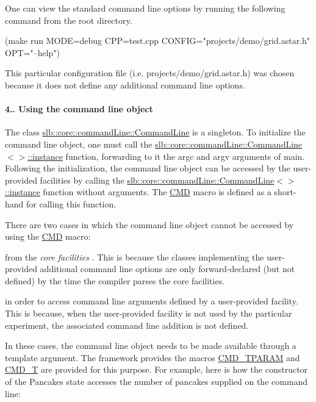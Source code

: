 One can view the standard command line options by running the following command from the root directory. \begin{DoxyVerb}(make run MODE=debug CPP=test.cpp CONFIG="projects/demo/grid.astar.h" OPT="--help")
\end{DoxyVerb}
 This particular configuration file (i.\+e. {\ttfamily projects/demo/grid.\+astar.\+h}) was chosen because it does not define any additional command line options.\hypertarget{index_s-singleton}{}\paragraph{4.. Using the command line object}\label{index_s-singleton}
The class \hyperlink{structslb_1_1core_1_1commandLine_1_1CommandLine}{slb\+::core\+::command\+Line\+::\+Command\+Line} is a singleton. To initialize the command line object, one must call the \hyperlink{structslb_1_1core_1_1commandLine_1_1CommandLine_a297df54d1f330d491717b487968b0fc5}{slb\+::core\+::command\+Line\+::\+Command\+Line$<$$>$\+::instance} function, forwarding to it the {\ttfamily argc} and {\ttfamily argv} arguments of {\ttfamily main}. Following the initialization, the command line object can be accessed by the user-\/provided facilities by calling the \hyperlink{structslb_1_1core_1_1commandLine_1_1CommandLine_a297df54d1f330d491717b487968b0fc5}{slb\+::core\+::command\+Line\+::\+Command\+Line$<$$>$\+::instance} function without arguments. The \hyperlink{command__line_8h_a0a5ceb9ceb914e08d345410b561cb37a}{C\+MD} macro is defined as a short-\/hand for calling this function.

There are two cases in which the command line object cannot be accessed by using the \hyperlink{command__line_8h_a0a5ceb9ceb914e08d345410b561cb37a}{C\+MD} macro\+:
\begin{DoxyItemize}
\item from the {\itshape core facilities} . This is because the classes implementing the user-\/provided additional command line options are only forward-\/declared (but not defined) by the time the compiler parses the core facilities.
\item in order to access command line arguments defined by a user-\/provided facility. This is because, when the user-\/provided facility is not used by the particular experiment, the associated command line addition is not defined.
\end{DoxyItemize}

In these cases, the command line object needs to be made available through a template argument. The framework provides the macros \hyperlink{command__line_8h_afba6f100063f1d8dec752ed393ff4e92}{C\+M\+D\+\_\+\+T\+P\+A\+R\+AM} and \hyperlink{command__line_8h_ad2bdd5f5511ceff17570c461fe447a56}{C\+M\+D\+\_\+T} are provided for this purpose. For example, here is how the constructor of the Pancake\textquotesingle{}s state accesses the number of pancakes supplied on the command line\+:


